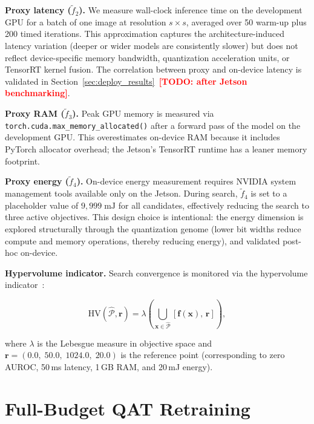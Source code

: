 \documentclass[journal]{IEEEtran}
\newcommand{\TODO}[1]{\textcolor{red}{\textbf{[TODO: #1]}}}
\begin{document}
\textbf{Proxy latency ($\tilde{f}_2$).}
We measure wall-clock inference time on the development GPU for a batch of one
image at resolution $s \times s$, averaged over 50 warm-up plus 200 timed
iterations.
This approximation captures the architecture-induced latency variation (deeper
or wider models are consistently slower) but does not reflect
device-specific memory bandwidth, quantization acceleration units, or TensorRT
kernel fusion.
The correlation between proxy and on-device latency is validated in
Section~\ref{sec:deploy_results}~\TODO{after Jetson benchmarking}.

\textbf{Proxy RAM ($\tilde{f}_3$).}
Peak GPU memory is measured via \texttt{torch.cuda.max\_memory\_allocated()} after
a forward pass of the model on the development GPU.
This overestimates on-device RAM because it includes PyTorch allocator overhead;
the Jetson's TensorRT runtime has a leaner memory footprint.

\textbf{Proxy energy ($\tilde{f}_4$).}
On-device energy measurement requires NVIDIA system management tools available
only on the Jetson.
During search, $\tilde{f}_4$ is set to a placeholder value of
$9{,}999\;\text{mJ}$ for all candidates, effectively reducing the search to
three active objectives.
This design choice is intentional: the energy dimension is explored
structurally through the quantization genome (lower bit widths reduce compute
and memory operations, thereby reducing energy), and validated post-hoc
on-device.

\medskip
\noindent\textbf{Hypervolume indicator.}
Search convergence is monitored via the hypervolume
indicator~\cite{zitzler1999multiobjective}:

\begin{equation}
\mathrm{HV}(\hat{\mathcal{P}}, \bm{r}) =
\lambda\!\left(\bigcup_{\bm{x} \in \hat{\mathcal{P}}}
  [\bm{f}(\bm{x}),\, \bm{r}]\right),
\label{eq:hv}
\end{equation}

where $\lambda$ is the Lebesgue measure in objective space and
$\bm{r} = (0.0,\; 50.0,\; 1024.0,\; 20.0)$ is the reference point
(corresponding to zero AUROC, 50\,ms latency, 1\,GB RAM, and 20\,mJ energy).

\section{Full-Budget QAT Retraining}
\label{sec:retraining}
\end{document}
